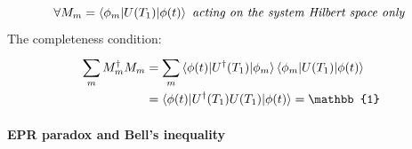 \documentclass[]{article}
\theoremstyle{nonumberplain}
\begin{document}
\[
	 \forall M_{m}=\braket{\phi_{m}|U(T_{1})|\phi(t)}\ \textit{acting on the system Hilbert space only }
\] 
The completeness condition:
\begin{equation*}
\begin{aligned}
	\sum^{}_{m} M_{m}^{\dagger}M_{m} &= \sum^{}_{m} \braket{\phi(t)|U^{\dagger}(T_{1})|\phi_{m}}\braket{\phi_{m}|U(T_{1})|\phi(t)}\\
												&=\braket{\phi(t)|U^{\dagger}(T_{1})U(T_{1})|\phi(t)} = \mathbb{1}
\end{aligned}
\end{equation*}
\paragraph{EPR paradox and Bell's inequality}%
\label{par:epr_paradox_and_bell_s_inequality} \ \\ 
\end{document}
